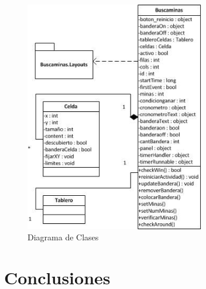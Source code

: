 \documentclass[11pt]{article} %
\begin{document}
\begin{center}

	\begin{figure}[h!]
  		\centering
    		\includegraphics[width=0.7\textwidth]{imagenes/diagramaClases.jpg}
  		\caption{Diagrama de Clases}
		\label{fig:diagclases}
	\end{figure}
\end{center}

\newpage
\thispagestyle{empty}

\section{\textbf{Conclusiones}}
\end{document}
